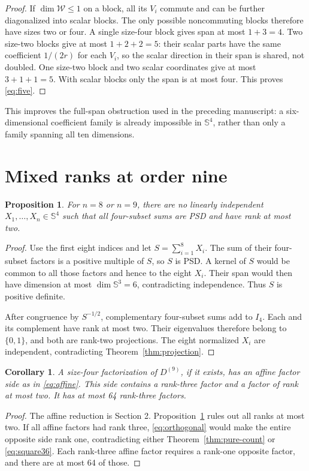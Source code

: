 \documentclass[11pt]{article}
\newtheorem{proposition}[theorem]{Proposition}
\newtheorem{corollary}[theorem]{Corollary}
\theoremstyle{remark}\newtheorem{remark}[theorem]{Remark}
\newcommand{\Sym}{\mathbb S}
\begin{document}
\begin{proof}
If $\dim\mathcal W\leq1$ on a block, all its $V_i$ commute and can be further diagonalized into scalar blocks. The only possible noncommuting blocks therefore have sizes two or four. A single size-four block gives span at most $1+3=4$. Two size-two blocks give at most $1+2+2=5$: their scalar parts have the same coefficient $1/(2r)$ for each $V_i$, so the scalar direction in their span is shared, not doubled. One size-two block and two scalar coordinates give at most $3+1+1=5$. With scalar blocks only the span is at most four. This proves \eqref{eq:five}.
\end{proof}

This improves the full-span obstruction used in the preceding manuscript: a six-dimensional coefficient family is already impossible in $\Sym^4$, rather than only a family spanning all ten dimensions.

\section{Mixed ranks at order nine}
\begin{proposition}\label{prop:affine-lowrank}
For $n=8$ or $n=9$, there are no linearly independent $X_1,\ldots,X_n\in\Sym^4$ such that all four-subset sums are PSD and have rank at most two.
\end{proposition}
\begin{proof}
Use the first eight indices and let $S=\sum_{i=1}^8X_i$. The sum of their four-subset factors is a positive multiple of $S$, so $S$ is PSD. A kernel of $S$ would be common to all those factors and hence to the eight $X_i$. Their span would then have dimension at most $\dim\Sym^3=6$, contradicting independence. Thus $S$ is positive definite.

After congruence by $S^{-1/2}$, complementary four-subset sums add to $I_4$. Each and its complement have rank at most two. Their eigenvalues therefore belong to $\{0,1\}$, and both are rank-two projections. The eight normalized $X_i$ are independent, contradicting Theorem~\ref{thm:projection}.
\end{proof}

\begin{corollary}\label{cor:mixed}
A size-four factorization of $D^{(9)}$, if it exists, has an affine factor side as in \eqref{eq:affine}. This side contains a rank-three factor and a factor of rank at most two. It has at most 64 rank-three factors.
\end{corollary}
\begin{proof}
The affine reduction is Section 2. Proposition~\ref{prop:affine-lowrank} rules out all ranks at most two. If all affine factors had rank three, \eqref{eq:orthogonal} would make the entire opposite side rank one, contradicting either Theorem~\ref{thm:pure-count} or \eqref{eq:square36}. Each rank-three affine factor requires a rank-one opposite factor, and there are at most 64 of those.
\end{proof}
\end{document}
